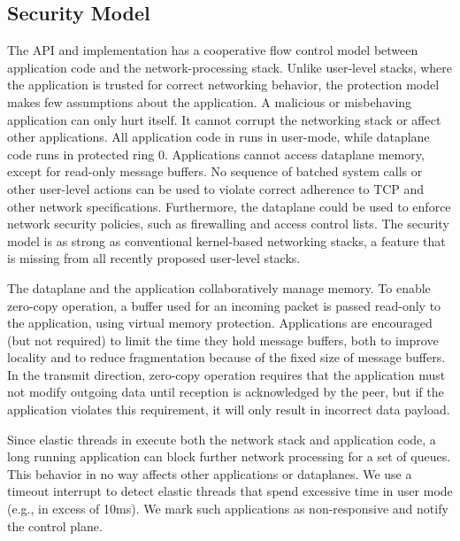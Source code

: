 \subsection{Security Model}
\label{sec:impl:coop}


The \ix API and implementation has a cooperative flow control
model between application code and the network-processing stack.
Unlike user-level stacks, where the application is trusted for correct
networking behavior, the \ix protection model makes few assumptions about the
application. A malicious or misbehaving application can only hurt
itself. It cannot corrupt the networking stack or affect other
applications. All application code in \ix runs in user-mode, while
dataplane code runs in protected ring 0. Applications cannot access
dataplane memory, except for read-only message buffers.  No sequence
of batched system calls or other user-level actions can be used to
violate correct adherence to TCP and other network specifications.
Furthermore, the dataplane could be used to enforce network security
policies, such as firewalling and access control lists.
The \ix security model is as strong as
conventional kernel-based networking stacks, a feature that is missing
from all recently proposed user-level stacks.

The \ix dataplane and the application collaboratively manage
memory. To enable zero-copy operation, a buffer used for an incoming
packet is passed read-only to the application, using virtual memory protection.
Applications are encouraged (but not required) to limit the time they hold message buffers,
both to improve locality and to reduce fragmentation because of the fixed
size of message buffers.  In the
transmit direction, zero-copy operation requires that the application
must not modify outgoing data until reception is acknowledged by the
peer, but if the application violates this requirement, it will
only result in incorrect data payload.

Since elastic threads in \ix execute both the network stack and
application code, a long running application can block further network
processing for a set of queues. This behavior in no way affects other
applications or dataplanes. We use a timeout interrupt to detect
elastic threads that spend excessive time in user mode (e.g., in
excess of 10ms). We mark such applications as non-responsive and
notify the control plane.

